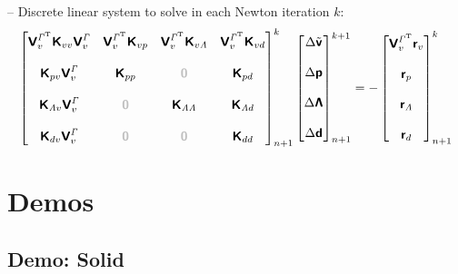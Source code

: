 \documentclass[a4paper,12pt]{report}
\newcommand{\bs}[1]{\boldsymbol{#1}}
\newcommand{\Gm}{\mathit{\Gamma}}
\newcommand{\zerom}{\textcolor{lightgray}{\bs{\mathsf{0}}}}
\newcommand{\ROP}{\bs{\mathsf{r}}}
\newcommand{\LMZ}{\bs{\mathsf{\Lambda}}}
\newcommand{\lmzi}{\mathit{\Lambda}} %
\begin{document}
-- Discrete linear system to solve in each Newton iteration $k$:
\begin{equation}
\label{equation-lin-sys-frsi-0d}
\begin{aligned}
\begin{bmatrix} \bs{\mathsf{V}}_{v}^{\Gm^\mathrm{T}}\bs{\mathsf{K}}_{vv}\bs{\mathsf{V}}_{v}^{\Gm} & \bs{\mathsf{V}}_{v}^{\Gm^\mathrm{T}}\bs{\mathsf{K}}_{vp} & \bs{\mathsf{V}}_{v}^{\Gm^\mathrm{T}}\bs{\mathsf{K}}_{v\lmzi} & \bs{\mathsf{V}}_{v}^{\Gm^\mathrm{T}}\bs{\mathsf{K}}_{vd} \\ \\ \bs{\mathsf{K}}_{pv}\bs{\mathsf{V}}_{v}^{\Gm} & \bs{\mathsf{K}}_{pp} & \zerom & \bs{\mathsf{K}}_{pd} \\ \\ \bs{\mathsf{K}}_{\lmzi v}\bs{\mathsf{V}}_{v}^{\Gm} & \zerom & \bs{\mathsf{K}}_{\lmzi \lmzi} & \bs{\mathsf{K}}_{\lmzi d} \\ \\ \bs{\mathsf{K}}_{dv}\bs{\mathsf{V}}_{v}^{\Gm}  & \zerom & \zerom & \bs{\mathsf{K}}_{dd} \end{bmatrix}_{n+1}^{k}\begin{bmatrix} \Delta\tilde{\bs{\mathsf{v}}} \\ \\ \Delta\bs{\mathsf{p}} \\ \\ \Delta\LMZ \\ \\ \Delta\bs{\mathsf{d}} \end{bmatrix}_{n+1}^{k+1}=-\begin{bmatrix} \bs{\mathsf{V}}_{v}^{\Gm^\mathrm{T}}\ROP_{v} \\ \\ \ROP_{p} \\ \\ \ROP_{\lmzi} \\ \\ \ROP_{d}\end{bmatrix}_{n+1}^{k}
\end{aligned}
\end{equation}


\section{Demos}\label{demos}

\subsection{Demo: Solid}\label{demo-solid}
\end{document}
